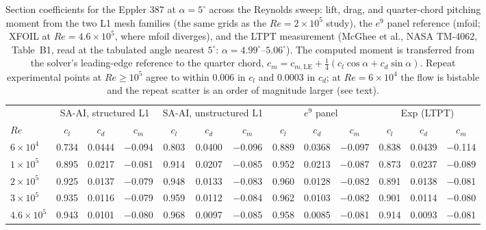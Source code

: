 \documentclass[journal]{new-aiaa}
\begin{document}
\begin{table}[tp]
  \centering
  \small
  \setlength{\tabcolsep}{4.5pt}
  \caption{Section coefficients for the Eppler 387 at $\alpha\!=\!5^\circ$
  across the Reynolds sweep: lift, drag, and quarter-chord pitching moment from
  the two L1 mesh families (the same grids as the $Re\!=\!2\!\times\!10^5$
  study), the $e^9$ panel reference (mfoil; XFOIL at $Re\!=\!4.6\!\times\!10^5$,
  where mfoil diverges), and the LTPT measurement (McGhee et al., NASA TM-4062,
  Table~B1, read at the tabulated angle nearest $5^\circ$:
  $\alpha\!=\!4.99^\circ$--$5.06^\circ$). The computed moment is transferred
  from the solver's leading-edge reference to the quarter chord,
  $c_m\!=\!c_{m,\mathrm{LE}}+\tfrac14(c_l\cos\alpha+c_d\sin\alpha)$. Repeat
  experimental points at $Re\!\geq\!10^5$ agree to within $0.006$ in $c_l$ and
  $0.0003$ in $c_d$; at $Re\!=\!6\!\times\!10^4$ the flow is bistable and the
  repeat scatter is an order of magnitude larger (see text).}
  \label{tab:eppresweep}
  \begin{tabular}{l ccc ccc ccc ccc}
    \toprule
    & \multicolumn{3}{c}{SA-AI, structured L1} & \multicolumn{3}{c}{SA-AI, unstructured L1}
    & \multicolumn{3}{c}{$e^9$ panel} & \multicolumn{3}{c}{Exp (LTPT)}\\
    \cmidrule(lr){2-4}\cmidrule(lr){5-7}\cmidrule(lr){8-10}\cmidrule(lr){11-13}
    $Re$ & $c_l$ & $c_d$ & $c_m$ & $c_l$ & $c_d$ & $c_m$ & $c_l$ & $c_d$ & $c_m$ & $c_l$ & $c_d$ & $c_m$ \\
    \midrule
    $6\!\times\!10^4$   & 0.734 & 0.0444 & $-$0.094 & 0.803 & 0.0400 & $-$0.096 & 0.889 & 0.0368 & $-$0.097 & 0.838 & 0.0439 & $-$0.114 \\
    $1\!\times\!10^5$   & 0.895 & 0.0217 & $-$0.081 & 0.914 & 0.0207 & $-$0.085 & 0.952 & 0.0213 & $-$0.087 & 0.873 & 0.0237 & $-$0.089 \\
    $2\!\times\!10^5$   & 0.925 & 0.0137 & $-$0.079 & 0.948 & 0.0133 & $-$0.083 & 0.960 & 0.0128 & $-$0.082 & 0.891 & 0.0138 & $-$0.081 \\
    $3\!\times\!10^5$   & 0.935 & 0.0116 & $-$0.079 & 0.959 & 0.0112 & $-$0.084 & 0.962 & 0.0103 & $-$0.082 & 0.901 & 0.0114 & $-$0.080 \\
    $4.6\!\times\!10^5$ & 0.943 & 0.0101 & $-$0.080 & 0.968 & 0.0097 & $-$0.085 & 0.958 & 0.0085 & $-$0.081 & 0.914 & 0.0093 & $-$0.081 \\
    \bottomrule
  \end{tabular}
\end{table}
\end{document}
